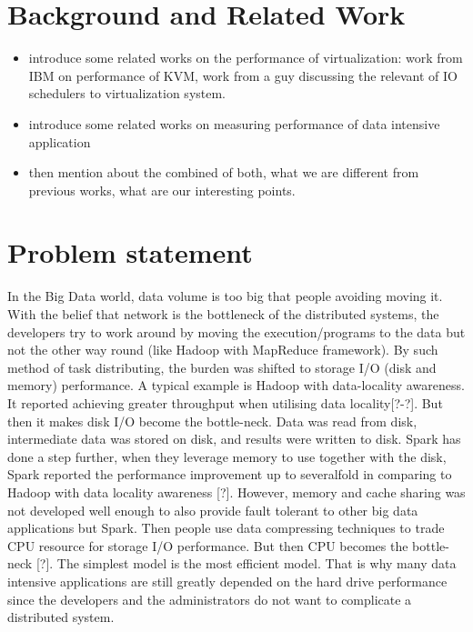 \documentclass{acmsig}
\begin{document}


\section{Background and Related Work}
\begin{itemize}
  \item introduce some related works on the performance of virtualization: work from IBM on performance of KVM, work from a guy discussing the relevant of IO schedulers to virtualization system.
  \item introduce some related works on measuring performance of data intensive application
 \item then mention about the combined of both, what we are different from previous works, what are our interesting points.
\end{itemize}
\section{Problem statement}

In the Big Data world, data volume is too big that people avoiding moving it. With the belief that network is the bottleneck of the distributed systems, the developers try to work around by moving the execution/programs to the data but not the other way round (like Hadoop with MapReduce framework). By such method of task distributing, the burden was shifted to storage I/O (disk and memory) performance. A typical example is Hadoop with data-locality awareness. It reported achieving greater throughput when utilising data locality[?-?]. But then it makes disk I/O become the bottle-neck. Data was read from disk, intermediate data was stored on disk, and results were written to disk. Spark has done a step further, when they leverage memory to use together with the disk, Spark reported the performance improvement up to severalfold in comparing to Hadoop with data locality awareness [?]. However, memory and cache sharing was not developed well enough to also provide fault tolerant to other big data applications but Spark. Then people use data compressing techniques to trade CPU resource for storage I/O performance. But then CPU becomes the bottle-neck [?]. The simplest model is the most efficient model. That is why many data intensive applications are still greatly depended on the hard drive performance since the developers and the administrators do not want to complicate a distributed system.
\end{document}
